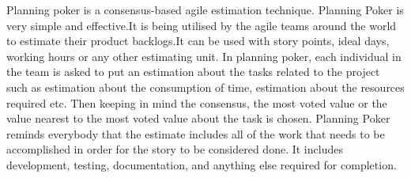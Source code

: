 Planning poker is a consensus-based agile estimation technique. Planning Poker is very simple and effective.It is being utilised by the agile teams around the world to estimate their product backlogs.It can be used with story points, ideal days, working hours or any other estimating unit.
In planning poker, each individual in the team is asked to put an estimation about the tasks related to the project such as estimation about the consumption of time, estimation about the resources required etc. Then keeping in mind the consensus, the most voted value or the value nearest to the most voted value about the task is chosen.
Planning Poker reminds everybody that the estimate includes all of the work that needs to be accomplished in order for the story to be considered done. It includes development, testing, documentation, and anything else required for completion.
